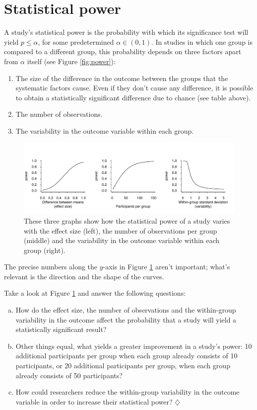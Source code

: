 \documentclass[a4paper]{tufte-book}\usepackage[]{graphicx}\usepackage[]{xcolor}
\newcommand*{\parend}[1][$\diamondsuit$]{%
\leavevmode\unskip\penalty9999 \hbox{}\nobreak\hfill
    \quad\hbox{#1}%
}
\begin{document}
\section{Statistical power}\label{sec:power}
A study's statistical power is the probability with which its significance test
will yield $p \leq \alpha$, for some predetermined $\alpha \in (0, 1)$. 
In studies in which one group is compared to a different
group, this probability depends on three factors apart from $\alpha$ itself (see Figure \vref{fig:power}):

\begin{enumerate}
\item The size of the difference in the outcome between the groups
that the systematic factors cause. Even if they don't cause any difference, it is possible to obtain a statistically significant difference due to chance (see table above).
\item The number of observations.
\item The variability in the outcome variable within each group.
\end{enumerate}

\begin{figure}[htp]
    \centering
    \includegraphics[width=\textwidth]{figure/power}
    \caption{These three graphs show how the statistical power of a study varies with the effect size (left), the number of observations per group (middle) and the variability in the outcome variable within each group (right).}
    \label{fig:power}
\end{figure}

The precise numbers along the $y$-axis in Figure \ref{fig:power}
aren't important; what's relevant is the direction and the shape of the curves.

Take a look at Figure \ref{fig:power} and answer the following questions:

\begin{enumerate}[(a)]
\item How do the effect size, the number of observations and the within-group variability in the outcome affect the probability that a study will yield a statistically significant result?

\item Other things equal, what yields a greater improvement in a study's power:
10 additional participants per group when each group already consists of 10 participants, or 20 additional
participants per group, when each group already consists of 50 participants?

\item How could researchers reduce the within-group variability in the outcome variable in order
to increase their statistical power? \parend
\end{enumerate}
\end{document}

